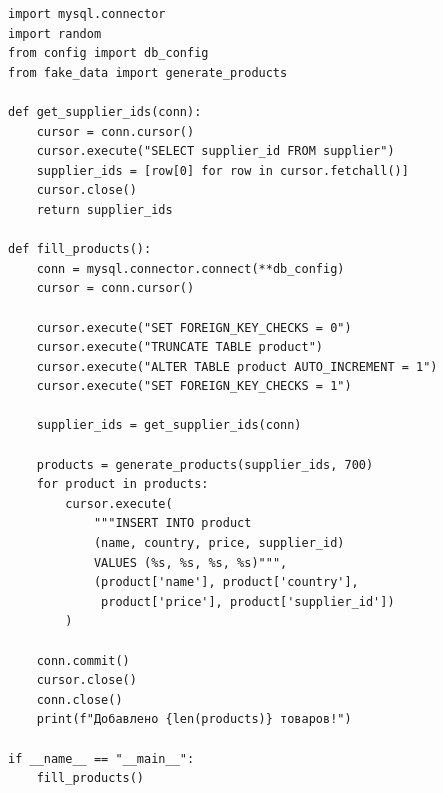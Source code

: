 \documentclass[a4paper]{article}
\begin{document}
\begin{lstlisting}[caption = Заполнение таблицы Product, basicstyle= \scriptsize \ttfamily]
import mysql.connector
import random
from config import db_config
from fake_data import generate_products

def get_supplier_ids(conn):
    cursor = conn.cursor()
    cursor.execute("SELECT supplier_id FROM supplier")
    supplier_ids = [row[0] for row in cursor.fetchall()]
    cursor.close()
    return supplier_ids

def fill_products():
    conn = mysql.connector.connect(**db_config)
    cursor = conn.cursor()

    cursor.execute("SET FOREIGN_KEY_CHECKS = 0")
    cursor.execute("TRUNCATE TABLE product")
    cursor.execute("ALTER TABLE product AUTO_INCREMENT = 1")
    cursor.execute("SET FOREIGN_KEY_CHECKS = 1")

    supplier_ids = get_supplier_ids(conn)

    products = generate_products(supplier_ids, 700)
    for product in products:
        cursor.execute(
            """INSERT INTO product 
            (name, country, price, supplier_id)
            VALUES (%s, %s, %s, %s)""",
            (product['name'], product['country'], 
             product['price'], product['supplier_id'])
        )
    
    conn.commit()
    cursor.close()
    conn.close()
    print(f"Добавлено {len(products)} товаров!")

if __name__ == "__main__":
    fill_products()

\end{lstlisting}
\end{document}
